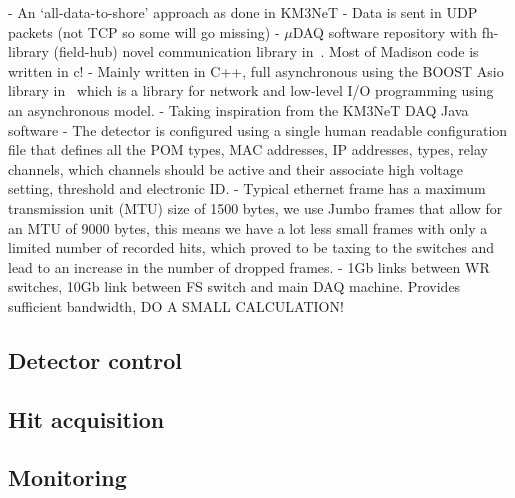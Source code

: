 - An `all-data-to-shore' approach as done in KM3NeT
- Data is sent in UDP packets (not TCP so some will go missing)
- $\mu$DAQ software repository with fh-library (field-hub) novel communication library
in~\cite{microdaq2020}. Most of Madison code is written in c!
- Mainly written in C++, full asynchronous using the BOOST Asio library in~\cite{boost2020} which
is a library for network and low-level I/O programming using an asynchronous model.
- Taking inspiration from the KM3NeT DAQ Java software
- The detector is configured using a single human readable configuration file that defines all the
POM types, MAC addresses, IP addresses, types, relay channels, which channels should be active and
their associate high voltage setting, threshold and electronic ID.
- Typical ethernet frame has a maximum transmission unit (MTU) size of 1500 bytes, we use Jumbo
frames that allow for an MTU of 9000 bytes, this means we have a lot less small frames with only a
limited number of recorded hits, which proved to be taxing to the switches and lead to an increase
in the number of dropped frames.
- 1Gb links between WR switches, 10Gb link between FS switch and main DAQ machine. Provides
sufficient bandwidth, DO A SMALL CALCULATION!

\subsection{Detector control} %
\label{sec:daq_soft_control} %

\subsection{Hit acquisition} %
\label{sec:daq_soft_hits} %

\subsection{Monitoring} %
\label{sec:daq_soft_monitor} %

